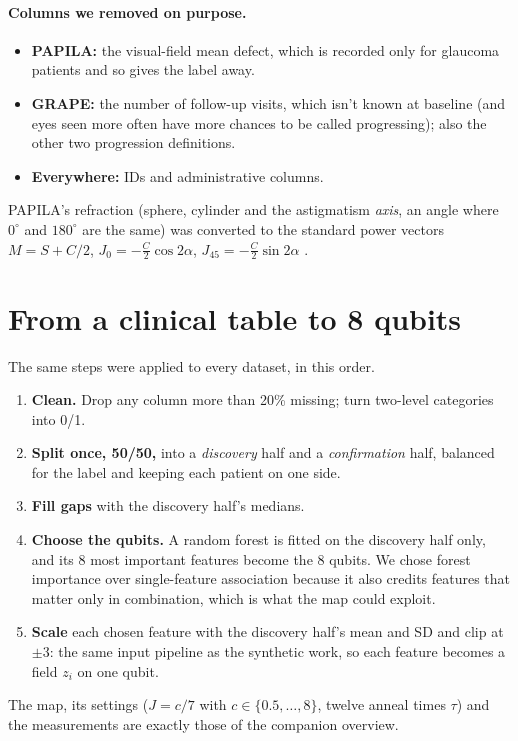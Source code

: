 \documentclass[11pt]{article}
\begin{document}
\paragraph{Columns we removed on purpose.}
\begin{itemize}\setlength{\itemsep}{2pt}
\item \textbf{PAPILA:} the visual-field mean defect, which is recorded only for glaucoma patients and so gives
the label away.
\item \textbf{GRAPE:} the number of follow-up visits, which isn't known at baseline (and eyes seen more often
have more chances to be called progressing); also the other two progression definitions.
\item \textbf{Everywhere:} IDs and administrative columns.
\end{itemize}
PAPILA's refraction (sphere, cylinder and the astigmatism \emph{axis}, an angle where $0^\circ$ and
$180^\circ$ are the same) was converted to the standard power vectors $M=S+C/2$,
$J_0=-\tfrac C2\cos2\alpha$, $J_{45}=-\tfrac C2\sin2\alpha$ \citep{Thibos1997}.

\section{From a clinical table to 8 qubits}

The same steps were applied to every dataset, in this order.
\begin{enumerate}\setlength{\itemsep}{2pt}
\item \textbf{Clean.} Drop any column more than 20\% missing; turn two-level categories into 0/1.
\item \textbf{Split once, 50/50,} into a \emph{discovery} half and a \emph{confirmation} half, balanced for the
label and keeping each patient on one side.
\item \textbf{Fill gaps} with the discovery half's medians.
\item \textbf{Choose the qubits.} A random forest \citep{Breiman2001} is fitted on the discovery half only, and
its 8 most important features become the 8 qubits. We chose forest importance over single-feature
association because it also credits features that matter only in combination, which is what the map
could exploit.
\item \textbf{Scale} each chosen feature with the discovery half's mean and SD and clip at $\pm3$: the same
input pipeline as the synthetic work, so each feature becomes a field $z_i$ on one qubit.
\end{enumerate}
The map, its settings ($J=c/7$ with $c\in\{0.5,\dots,8\}$, twelve anneal times $\tau$) and the measurements
are exactly those of the companion overview.
\end{document}
